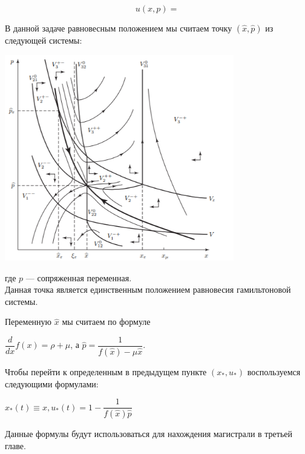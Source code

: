 \begin{equation}
u(x,p)=
\end{equation}


В данной задаче равновесным положением мы считаем точку $ (\hat{x},\hat{p}) $ из следующей системы:\\
\begin{center}
	\includegraphics[width=10cm]{dugi}
\end{center}
где $ p $ --- сопряженная переменная.\\
Данная точка является единственным положением равновесия гамильтоновой системы.

Переменную $ \hat{x} $ мы считаем по формуле
\begin{center}
	$ \dfrac{d}{dx}f(x) = \rho + \mu $, а $ \hat{p} = \dfrac{1}{f(\hat{x}) - \mu\hat{x}} $.
\end{center}
Чтобы перейти к определенным в предыдущем пункте  $ (x_*, u_*) $ воспользуемся следующими формулами:
\begin{center}
	$ x_*(t) \equiv x, u_*(t) =1 - \dfrac{1}{f(\hat{x})\hat{p}}$
\end{center}
Данные формулы будут использоваться для нахождения магистрали в третьей главе.
